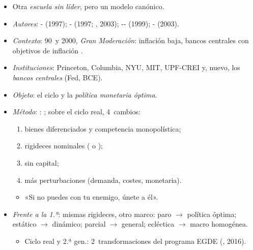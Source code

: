 \documentclass{article}
\begin{document}
\begin{columnas}
\begin{itemize}
\item Otra \emph{escuela sin líder}, pero un modelo canónico.
\item \emph{Autores}: - (1997); - (1997; , 2003); -- (1999); - (2003).
\item \emph{Contexto}: 90~y 2000, \emph{Gran Moderación}: inflación baja, bancos centrales con objetivos de inflación .
\item \emph{Instituciones}: Princeton, Columbia, NYU, MIT, UPF-CREI y, nuevo, los \emph{bancos centrales} (Fed, BCE).
\item \emph{Objeto}: el ciclo y la \emph{política monetaria óptima}.
\item \emph{Método}: :  ; sobre el ciclo real, 4~cambios:
  \begin{enumerate}
  \item bienes diferenciados y competencia monopolística;
  \item rigideces nominales ( o );
  \item sin capital;
  \item más perturbaciones (demanda, costes, monetaria).
  \end{enumerate}
  \begin{itemize}
  \item «Si no puedes con tu enemigo, únete a él».
  \end{itemize}
\item \emph{Frente a la 1.ª}: mismas rigideces, otro marco: paro $\to$ política óptima; estático $\to$ dinámico; parcial $\to$ general; ecléctica $\to$ macro homogénea.
  \begin{itemize}
  \item Ciclo real y 2.ª gen.: 2~transformaciones del programa EGDE (, 2016).
  \end{itemize}
\end{itemize}


\end{columnas}
\end{document}
